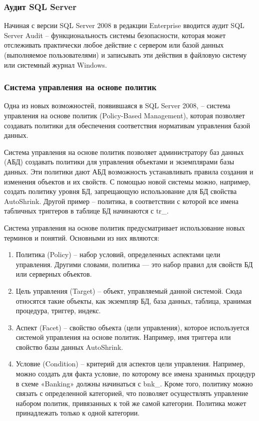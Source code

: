 \subsubsection{Аудит SQL Server}

Начиная с версии SQL Server 2008 в редакции Enterprise вводится аудит
SQL Server Audit – функциональность системы безопасности, которая
может отслеживать практически любое действие с сервером или базой
данных (выполняемое пользователями) и записывать эти действия в
файловую систему или системный журнал Windows.

\subsubsection{Система управления на основе политик}

Одна из новых возможностей, появившаяся в SQL Server 2008, – система
управления на основе политик (Policy-Based Management), которая
позволяет создавать политики для обеспечения соответствия нормативам
управления базой данных.

Система управления на основе политик позволяет администратору баз
данных (АБД) создавать политики для управления объектами и
экземплярами базы данных. Эти политики дают АБД возможность
устанавливать правила создания и изменения объектов и их свойств. С
помощью новой системы можно, например, создать политику уровня БД,
запрещающую использование для БД свойства AutoShrink. Другой пример –
политика, в соответствии с которой все имена табличных триггеров в
таблице БД начинаются с tr\_.

Система управления на основе политик предусматривает использование
новых терминов и понятий. Основными из них являются:

\begin{enumerate}
	\item Политика (Policy) – набор условий, определенных аспектами цели
	управления. Другими словами, политика — это набор правил для свойств
	БД или серверных объектов.
	\item Цель управления (Target) – объект, управляемый данной системой. Сюда относятся такие объекты, как экземпляр БД, база данных, таблица, хранимая процедура, триггер, индекс.
	\item Аспект (Facet) – свойство объекта (цели управления), которое
	используется системой управления на основе политик. Например, имя
	триггера или свойство базы данных AutoShrink.
	\item Условие (Condition) – критерий для аспектов цели управления. Например,
	можно создать для факта условие, по которому все имена хранимых
	процедур в схеме «Banking» должны начинаться с bnk\_.
	Кроме того, политику можно связать с определенной категорией, что
	позволяет осуществлять управление набором политик, привязанных к той
	же самой категории. Политика может принадлежать только к одной
	категории.
\end{enumerate}

